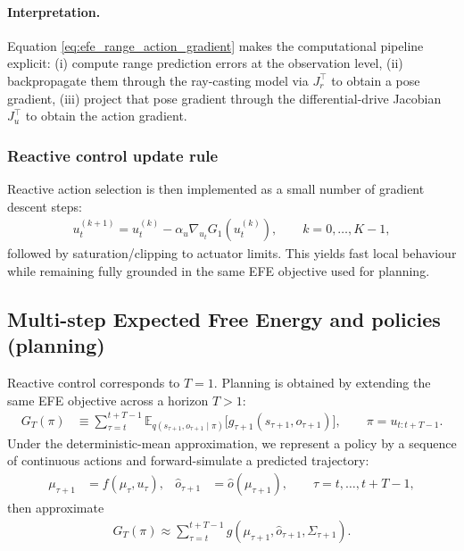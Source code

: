 \documentclass[a4paper, twoside]{article}
\begin{document}
\paragraph{Interpretation.}
Equation \eqref{eq:efe_range_action_gradient} makes the computational pipeline explicit:
(i) compute range prediction errors at the observation level,
(ii) backpropagate them through the ray-casting model via $J_r^\top$ to obtain a pose gradient,
(iii) project that pose gradient through the differential-drive Jacobian $J_u^\top$ to obtain the action gradient.

\subsubsection{Reactive control update rule}
Reactive action selection is then implemented as a small number of gradient descent steps:
\begin{align}
u_t^{(k+1)} = u_t^{(k)} - \alpha_u \nabla_{u_t}G_1(u_t^{(k)}),
\qquad
k=0,\dots,K-1,
\label{eq:reactive_update}
\end{align}
followed by saturation/clipping to actuator limits. This yields fast local behaviour while remaining fully grounded in the same EFE objective used for planning.

\subsection{Multi-step Expected Free Energy and policies (planning)}
\label{sec:55_multistep}

Reactive control corresponds to $T=1$. Planning is obtained by extending the same EFE objective across a horizon $T>1$:
\begin{align}
G_T(\pi)
&\equiv
\sum_{\tau=t}^{t+T-1}
\mathbb{E}_{q(s_{\tau+1},o_{\tau+1}\mid \pi)}
\big[
g_{\tau+1}(s_{\tau+1},o_{\tau+1})
\big],
\qquad
\pi = u_{t:t+T-1}.
\label{eq:efe_multistep_def}
\end{align}
Under the deterministic-mean approximation, we represent a policy by a sequence of continuous actions and forward-simulate a predicted trajectory:
\begin{align}
\mu_{\tau+1} &= f(\mu_{\tau},u_\tau),
&
\hat o_{\tau+1} &= \hat o(\mu_{\tau+1}),
\qquad \tau=t,\dots,t+T-1,
\label{eq:rollout}
\end{align}
then approximate
\begin{align}
G_T(\pi)\approx \sum_{\tau=t}^{t+T-1} g(\mu_{\tau+1},\hat o_{\tau+1},\Sigma_{\tau+1}).
\label{eq:efe_multistep_mean}
\end{align}
\end{document}
